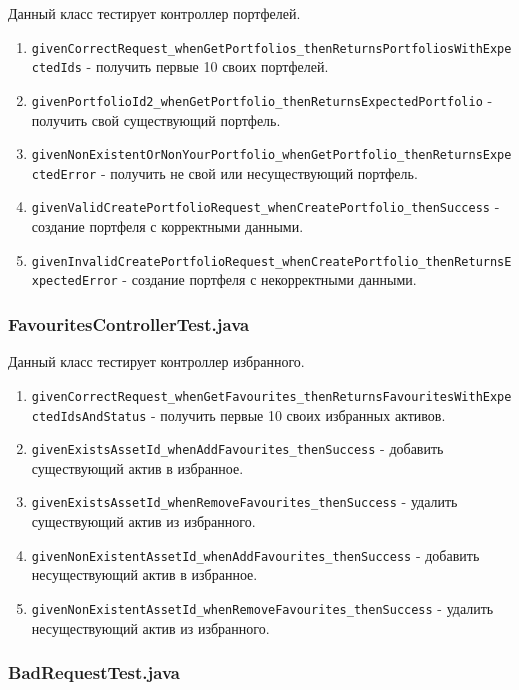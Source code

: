 \documentclass[a4paper, 14pt]{article}
\begin{document}
Данный класс тестирует контроллер портфелей.

\begin{enumerate}
    \item \texttt{givenCorrectRequest\_whenGetPortfolios\_thenReturnsPortfoliosWithExpectedIds} - получить первые 10 своих портфелей.
    \item \texttt{givenPortfolioId2\_whenGetPortfolio\_thenReturnsExpectedPortfolio} - получить свой существующий портфель.
    \item \texttt{givenNonExistentOrNonYourPortfolio\_whenGetPortfolio\_thenReturnsExpectedError} - получить не свой или несуществующий портфель.
    \item \texttt{givenValidCreatePortfolioRequest\_whenCreatePortfolio\_thenSuccess} - создание портфеля с корректными данными.
    \item \texttt{givenInvalidCreatePortfolioRequest\_whenCreatePortfolio\_thenReturnsExpectedError} - создание портфеля с некорректными данными.
\end{enumerate}

\subsubsection{FavouritesControllerTest.java}

Данный класс тестирует контроллер избранного.

\begin{enumerate}
    \item \texttt{givenCorrectRequest\_whenGetFavourites\_thenReturnsFavouritesWithExpectedIdsAndStatus} - получить первые 10 своих избранных активов.
    \item \texttt{givenExistsAssetId\_whenAddFavourites\_thenSuccess} - добавить существующий актив в избранное.
    \item \texttt{givenExistsAssetId\_whenRemoveFavourites\_thenSuccess} - удалить существующий актив из избранного.
    \item \texttt{givenNonExistentAssetId\_whenAddFavourites\_thenSuccess} - добавить несуществующий актив в избранное.
    \item \texttt{givenNonExistentAssetId\_whenRemoveFavourites\_thenSuccess} - удалить несуществующий актив из избранного.
\end{enumerate}

\subsubsection{BadRequestTest.java}
\end{document}
